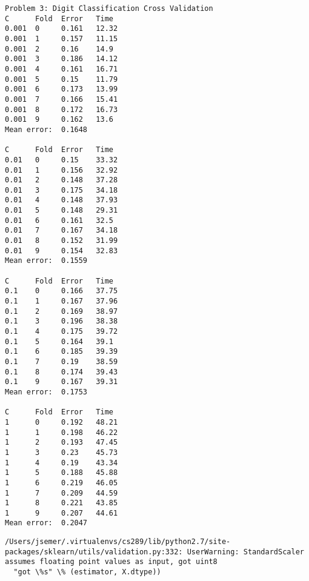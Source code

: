 \documentclass{article}
\begin{document}
    \begin{Verbatim}[commandchars=\\\{\}]
Problem 3: Digit Classification Cross Validation
C      Fold  Error   Time  
0.001  0     0.161   12.32 
0.001  1     0.157   11.15 
0.001  2     0.16    14.9  
0.001  3     0.186   14.12 
0.001  4     0.161   16.71 
0.001  5     0.15    11.79 
0.001  6     0.173   13.99 
0.001  7     0.166   15.41 
0.001  8     0.172   16.73 
0.001  9     0.162   13.6  
Mean error:  0.1648

C      Fold  Error   Time  
0.01   0     0.15    33.32 
0.01   1     0.156   32.92 
0.01   2     0.148   37.28 
0.01   3     0.175   34.18 
0.01   4     0.148   37.93 
0.01   5     0.148   29.31 
0.01   6     0.161   32.5  
0.01   7     0.167   34.18 
0.01   8     0.152   31.99 
0.01   9     0.154   32.83 
Mean error:  0.1559

C      Fold  Error   Time  
0.1    0     0.166   37.75 
0.1    1     0.167   37.96 
0.1    2     0.169   38.97 
0.1    3     0.196   38.38 
0.1    4     0.175   39.72 
0.1    5     0.164   39.1  
0.1    6     0.185   39.39 
0.1    7     0.19    38.59 
0.1    8     0.174   39.43 
0.1    9     0.167   39.31 
Mean error:  0.1753

C      Fold  Error   Time  
1      0     0.192   48.21 
1      1     0.198   46.22 
1      2     0.193   47.45 
1      3     0.23    45.73 
1      4     0.19    43.34 
1      5     0.188   45.88 
1      6     0.219   46.05 
1      7     0.209   44.59 
1      8     0.221   43.85 
1      9     0.207   44.61 
Mean error:  0.2047
    \end{Verbatim}

    \begin{Verbatim}[commandchars=\\\{\}]
/Users/jsemer/.virtualenvs/cs289/lib/python2.7/site-packages/sklearn/utils/validation.py:332: UserWarning: StandardScaler assumes floating point values as input, got uint8
  "got \%s" \% (estimator, X.dtype))
    \end{Verbatim}
\end{document}
